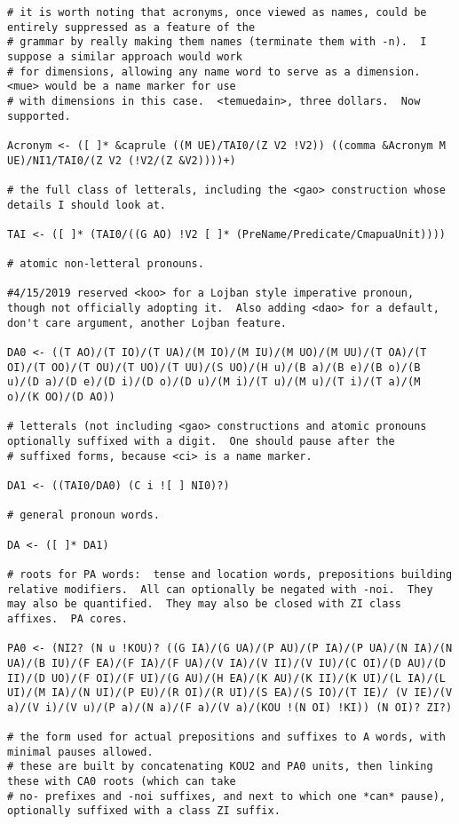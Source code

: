 \documentclass{article}
\begin{document}
\begin{verbatim}
# it is worth noting that acronyms, once viewed as names, could be entirely suppressed as a feature of the
# grammar by really making them names (terminate them with -n).  I suppose a similar approach would work
# for dimensions, allowing any name word to serve as a dimension.  <mue> would be a name marker for use
# with dimensions in this case.  <temuedain>, three dollars.  Now supported.

Acronym <- ([ ]* &caprule ((M UE)/TAI0/(Z V2 !V2)) ((comma &Acronym M UE)/NI1/TAI0/(Z V2 (!V2/(Z &V2))))+)

# the full class of letterals, including the <gao> construction whose details I should look at.

TAI <- ([ ]* (TAI0/((G AO) !V2 [ ]* (PreName/Predicate/CmapuaUnit))))

# atomic non-letteral pronouns.

#4/15/2019 reserved <koo> for a Lojban style imperative pronoun, though not officially adopting it.  Also adding <dao> for a default, don't care argument, another Lojban feature.

DA0 <- ((T AO)/(T IO)/(T UA)/(M IO)/(M IU)/(M UO)/(M UU)/(T OA)/(T OI)/(T OO)/(T OU)/(T UO)/(T UU)/(S UO)/(H u)/(B a)/(B e)/(B o)/(B u)/(D a)/(D e)/(D i)/(D o)/(D u)/(M i)/(T u)/(M u)/(T i)/(T a)/(M o)/(K OO)/(D AO))

# letterals (not including <gao> constructions and atomic pronouns optionally suffixed with a digit.  One should pause after the
# suffixed forms, because <ci> is a name marker.

DA1 <- ((TAI0/DA0) (C i ![ ] NI0)?)

# general pronoun words.

DA <- ([ ]* DA1)

# roots for PA words:  tense and location words, prepositions building relative modifiers.  All can optionally be negated with -noi.  They may also be quantified.  They may also be closed with ZI class affixes.  PA cores.

PA0 <- (NI2? (N u !KOU)? ((G IA)/(G UA)/(P AU)/(P IA)/(P UA)/(N IA)/(N UA)/(B IU)/(F EA)/(F IA)/(F UA)/(V IA)/(V II)/(V IU)/(C OI)/(D AU)/(D II)/(D UO)/(F OI)/(F UI)/(G AU)/(H EA)/(K AU)/(K II)/(K UI)/(L IA)/(L UI)/(M IA)/(N UI)/(P EU)/(R OI)/(R UI)/(S EA)/(S IO)/(T IE)/ (V IE)/(V a)/(V i)/(V u)/(P a)/(N a)/(F a)/(V a)/(KOU !(N OI) !KI)) (N OI)? ZI?)

# the form used for actual prepositions and suffixes to A words, with minimal pauses allowed.
# these are built by concatenating KOU2 and PA0 units, then linking these with CA0 roots (which can take
# no- prefixes and -noi suffixes, and next to which one *can* pause), optionally suffixed with a class ZI suffix.


\end{verbatim}
\end{document}
